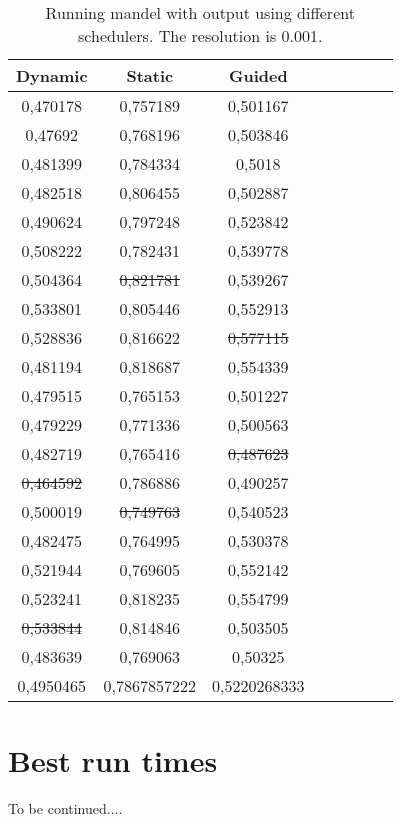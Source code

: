 \documentclass[a4paper]{article}
\begin{document}
\begin{table}
	\caption{Running mandel with output using different schedulers. The resolution is 0.001.}
	\label{table:mandel_schedulers}
	\begin{tabular}{| c | c | c | c | c | c | c | c |}
		\hline
		Dynamic & Static & Guided\\ 
		\hline
		0,470178 & 0,757189 & 0,501167\\ 
		0,47692 & 0,768196 & 0,503846\\ 
		0,481399 & 0,784334 & 0,5018\\ 
		0,482518 & 0,806455 & 0,502887\\ 
		0,490624 & 0,797248 & 0,523842\\ 
		0,508222 & 0,782431 & 0,539778\\ 
		0,504364 & \st{0,821781} & 0,539267\\ 
		0,533801 & 0,805446 & 0,552913\\ 
		0,528836 & 0,816622 & \st{0,577115}\\ 
		0,481194 & 0,818687 & 0,554339\\ 
		0,479515 & 0,765153 & 0,501227\\ 
		0,479229 & 0,771336 & 0,500563\\ 
		0,482719 & 0,765416 & \st{0,487623}\\ 
		\st{0,464592} & 0,786886 & 0,490257\\ 
		0,500019 & \st{0,749763} & 0,540523\\ 
		0,482475 & 0,764995 & 0,530378\\ 
		0,521944 & 0,769605 & 0,552142\\ 
		0,523241 & 0,818235 & 0,554799\\ 
		\st{0,533844} & 0,814846 & 0,503505\\ 
		0,483639 & 0,769063 & 0,50325\\ 
		\hline
		0,4950465 & 0,7867857222 & 0,5220268333\\ 
		\hline
	\end{tabular}
\end{table}

\section{Best run times}
	To be continued....
\end{document}
